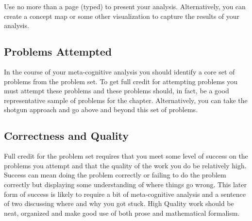 \documentclass[nobib]{tufte-handout}
\begin{document}
Use no more than a page (typed) to present your analysis. Alternatively, you can create a concept map or some other visualization to capture the results of your analysis.

\subsection*{Problems Attempted}

In the course of your meta-cognitive analysis you should identify a core set of problems from the problem set.  To get full credit for attempting problems you must attempt these problems and these problems should, in fact, be a good representative sample of problems for the chapter. Alternatively, you can take the shotgun approach and go above and beyond this set of problems.

\subsection*{Correctness and Quality}

Full credit for the problem set requires that you meet some level of success on the problems you attempt and that the quality of the work you do be relatively high. Success can mean doing the problem correctly or failing to do the problem correctly but displaying some understanding of where things go wrong.  This later form of success is likely to require a bit of meta-cognitive analysis and a sentence of two discussing where and why you got stuck. High Quality work should be neat, organized and make good use of both prose and mathematical formalism.
\end{document}
